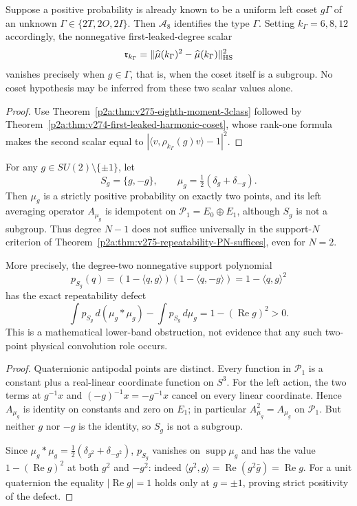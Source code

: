 \documentclass[12pt,a4paper]{article}
\begin{document}
\begin{corollary}
\label{p2a:cor:v275-coset-type-and-origin-test}
Suppose a positive probability is already known to be a uniform
left coset $g\Gamma$ of an unknown
$\Gamma\in\{2T,2O,2I\}$. Then $\mathcal A_8$ identifies the
type $\Gamma$. Setting $k_\Gamma=6,8,12$ accordingly, the
nonnegative first-leaked-degree scalar
\[
 \mathfrak r_{k_\Gamma}
   =\|\widehat\mu(k_\Gamma)^2
      -\widehat\mu(k_\Gamma)\|_{\rm HS}^2
\]
vanishes precisely when $g\in\Gamma$, that is, when the coset
itself is a subgroup. No coset hypothesis may be inferred from
these two scalar values alone.
\end{corollary}
\begin{proof}
Use Theorem~\ref{p2a:thm:v275-eighth-moment-3class} followed by
Theorem~\ref{p2a:thm:v274-first-leaked-harmonic-coset},
whose rank-one formula makes the second scalar equal to
$|\langle v,\rho_{k_\Gamma}(g)v\rangle-1|^2$.
\end{proof}
\begin{proposition}
\label{p2a:prop:v278-two-point-band-sharpness}
For any $g\in SU(2)\setminus\{\pm1\}$, let
\[
 S_g=\{g,-g\},\qquad
 \mu_g=\tfrac12(\delta_g+\delta_{-g}).
\]
Then $\mu_g$ is a strictly positive probability on exactly two
points, and its left averaging operator $A_{\mu_g}$ is idempotent
on $\mathcal P_1=E_0\oplus E_1$, although $S_g$ is not a subgroup.
Thus degree $N-1$ does not suffice universally in the support-$N$
criterion of Theorem~\ref{p2a:thm:v275-repeatability-PN-suffices},
even for $N=2$.

More precisely, the degree-two nonnegative support polynomial
\[
 p_{S_g}(q)=(1-\langle q,g\rangle)(1-\langle q,-g\rangle)
            =1-\langle q,g\rangle^2
\]
has the exact repeatability defect
\[
 \boxed{\int p_{S_g}\,d(\mu_g*\mu_g)
            -\int p_{S_g}\,d\mu_g
       =1-(\operatorname{Re}g)^2>0.}
\]
This is a mathematical lower-band obstruction, not evidence that
any such two-point physical convolution role occurs.
\end{proposition}
\begin{proof}
Quaternionic antipodal points are distinct.  Every function in
$\mathcal P_1$ is a constant plus a real-linear coordinate function
on $S^3$.  For the left action, the two terms at $g^{-1}x$ and
$(-g)^{-1}x=-g^{-1}x$ cancel on every linear coordinate.  Hence
$A_{\mu_g}$ is identity on constants and zero on $E_1$; in particular
$A_{\mu_g}^2=A_{\mu_g}$ on $\mathcal P_1$.  But neither $g$ nor
$-g$ is the identity, so $S_g$ is not a subgroup.

Since $\mu_g*\mu_g=\tfrac12(\delta_{g^2}+\delta_{-g^2})$,
$p_{S_g}$ vanishes on $\operatorname{supp}\mu_g$ and has the value
$1-(\operatorname{Re}g)^2$ at both $g^2$ and $-g^2$:
indeed $\langle g^2,g\rangle=\operatorname{Re}(g^2\bar g)
=\operatorname{Re}g$.
For a unit quaternion the equality $|\operatorname{Re}g|=1$
holds only at $g=\pm1$, proving strict positivity of the defect.
\end{proof}
\end{document}
